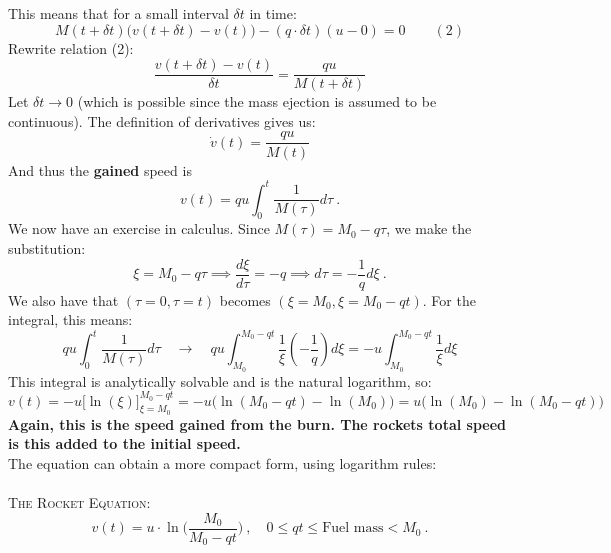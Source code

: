 \documentclass{article}
\begin{document}
This means that for a small interval $\delta t$ in time:
\begin{equation*}
    M(t+\delta t)\Big(v(t+\delta t)-v(t)\Big) -(q\cdot\delta t)(u-0)=0  \quad \quad (2)
\end{equation*}
Rewrite relation (2):
$$
\frac{v(t+\delta t)-v(t)}{\delta t}=\frac{qu}{M(t+\delta t)}
$$
Let $\delta t \rightarrow 0$ (which is possible since the mass ejection is assumed to be continuous). The definition of derivatives gives us:
$$
\dot{v}(t)=\frac{qu}{M(t)}
$$
And thus the \textbf{gained} speed is
$$
v(t) = qu\int_0^t\frac{1}{M(\tau)}d\tau \ .
$$
We now have an exercise in calculus. Since $M(\tau)=M_0-q\tau$, we make the substitution:
$$
\xi=M_0-q\tau \implies \frac{d\xi}{d\tau}=-q \implies d\tau=-\frac{1}{q}d\xi \ .
$$
We also have that $(\tau=0,\tau=t)$ becomes $(\xi=M_0,\xi=M_0-qt)$. For the integral, this means:
$$
qu\int_0^t\frac{1}{M(\tau)}d\tau \quad \longrightarrow \quad qu\int_{M_0}^{M_0-qt}\frac{1}{\xi}(-\frac{1}{q})d\xi
=-u\int_{M_0}^{M_0-qt}\frac{1}{\xi}d\xi $$
This integral is analytically solvable and is the natural logarithm, so:
$$
v(t) = -u\Big[\ln(\xi)\Big]_{\xi=M_0}^{M_0-qt}=-u\big(\ln(M_0-qt)-\ln(M_0)\big) = u\big(\ln(M_0)-\ln(M_0-qt)\big)
$$
\textbf{Again, this is the speed gained from the burn. The rockets total speed is this added to the initial speed.}\\ 

The equation can obtain a more compact form, using logarithm rules:
\\
\vspace{1 cm} \\
\textsc{The Rocket Equation:}
$$
v(t)=u\cdot\ln\Big(\frac{M_0}{M_0-qt}\Big) \ , \quad 0\leq qt\leq \textrm{Fuel mass}< M_0 \ .
$$

\newpage
\end{document}
